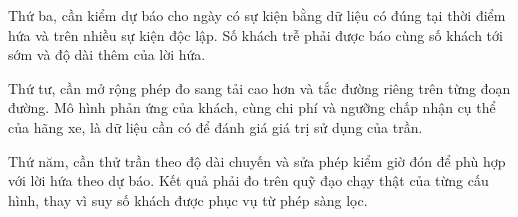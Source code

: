 Thứ ba, cần kiểm dự báo cho ngày có sự kiện bằng dữ liệu có đúng tại thời điểm hứa và trên nhiều sự kiện độc lập. Số khách trễ phải được báo cùng số khách tới sớm và độ dài thêm của lời hứa.

Thứ tư, cần mở rộng phép đo sang tải cao hơn và tắc đường riêng trên từng đoạn đường. Mô hình phản ứng của khách, cùng chi phí và ngưỡng chấp nhận cụ thể của hãng xe, là dữ liệu cần có để đánh giá giá trị sử dụng của trần.

Thứ năm, cần thử trần theo độ dài chuyến và sửa phép kiểm giờ đón để phù hợp với lời hứa theo dự báo. Kết quả phải đo trên quỹ đạo chạy thật của từng cấu hình, thay vì suy số khách được phục vụ từ phép sàng lọc.
